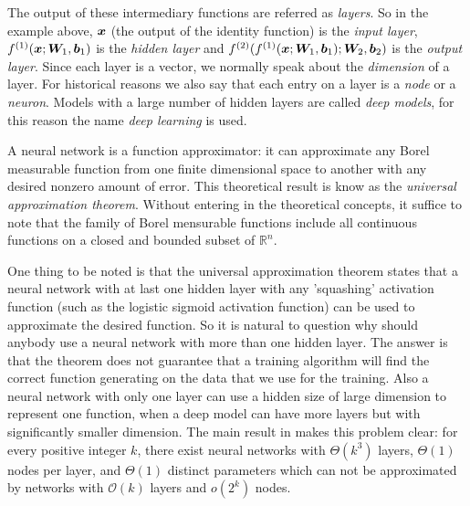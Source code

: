 The output of these intermediary functions are referred as \textit{layers}. So in the example above, $\bm{x}$ (the output of the identity function) is the \textit{input layer}, $f^{(1)}(\bm{x}; \bm{W}_1, \bm{b}_1)$ is the \textit{hidden layer} and $f^{(2)}(f^{(1)}(\bm{x}; \bm{W}_1, \bm{b}_1); \bm{W}_2, \bm{b}_2)$ is the \textit{output layer}. Since each layer is a vector, we normally speak about the \textit{dimension} of a layer. For historical reasons we also say that each entry on a layer is a \textit{node} or a \textit{neuron}.  Models with a large number of hidden layers are called \textit{deep models}, for this reason the name \textit{deep learning} is used.  

\par A neural network is a function approximator: it can approximate any Borel measurable function from one finite dimensional space to another with any desired nonzero amount of error. This theoretical result is know as the \textit{universal approximation theorem}\cite{Cybenko}. Without entering in the theoretical concepts, it suffice to note that the family of Borel mensurable functions include all continuous functions on a closed and bounded subset of $\mathbb{R}^n$.


\par One thing to be noted is that the universal approximation theorem states that a neural network with at last one hidden layer with any 'squashing' activation function (such as the logistic sigmoid activation function) can be used to approximate the desired function. So it is natural to question why should anybody use a neural network with more than one hidden layer. The answer is that the theorem does not guarantee that a training algorithm will find the correct function generating on the data that we use for the training. Also a neural network with only one layer can use a hidden size of large dimension to represent one function, when a deep model can have more layers but with significantly smaller dimension. The main result in \cite{Telgarsky} makes this problem clear: for every positive integer $k$, there exist neural networks with $\Theta(k^3)$ layers, $\Theta(1)$ nodes per layer, and $\Theta(1)$ distinct parameters which can not be approximated by networks with $\mathcal{O}(k)$ layers and $o(2^k)$ nodes.  

